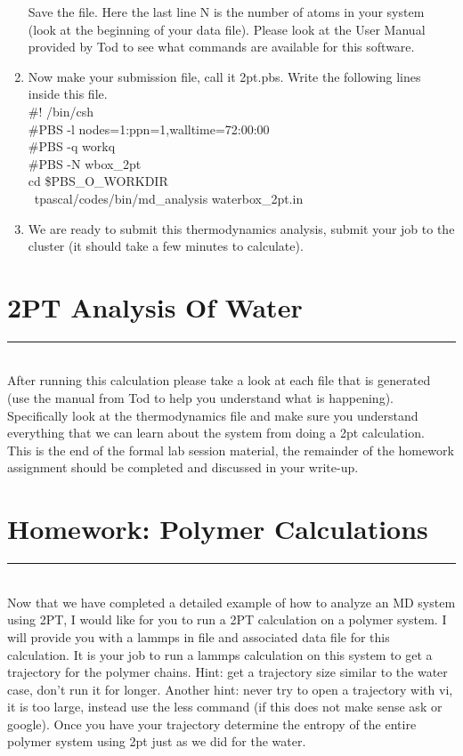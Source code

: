 \documentclass{article}
\begin{document}
\begin{enumerate}
Save the file.
Here the last line N is the number of atoms in your system (look at the beginning of your data file). 
Please look at the User Manual provided by Tod to see what commands are available for this software. \\

\item Now make your submission file, call it 2pt.pbs.
Write the following lines inside this file.\\
\#! /bin/csh\\
\#PBS -l nodes=1:ppn=1,walltime=72:00:00\\
\#PBS -q workq\\
\#PBS -N wbox\_2pt\\
cd \$PBS\_O\_WORKDIR\\
~tpascal/codes/bin/md\_analysis waterbox\_2pt.in\\

\item We are ready to submit this thermodynamics analysis, submit your job to the cluster (it should take a few minutes to calculate).
\end{enumerate}

\section{2PT Analysis Of Water}
\noindent\rule[0.5ex]{\linewidth}{1pt}\\

After running this calculation please take a look at each file that is generated (use the manual from Tod to help you understand what is happening). 
Specifically look at the thermodynamics file and make sure you understand everything that we can learn about the system from doing a 2pt calculation.\\

This is the end of the formal lab session material, the remainder of the homework assignment should be completed and discussed in your write-up.

\section{Homework: Polymer Calculations}
\noindent\rule[0.5ex]{\linewidth}{1pt}\\

Now that we have completed a detailed example of how to analyze an MD system using 2PT, I would like for you to run a 2PT calculation on a polymer system. 
I will provide you with a lammps in file and associated data file for this calculation.
It is your job to run a lammps calculation on this system to get a trajectory for the polymer chains.
Hint: get a trajectory size similar to the water case, don't run it for longer. 
Another hint: never try to open a trajectory with vi, it is too large, instead use the less command (if this does not make sense ask or google). 
Once you have your trajectory determine the entropy of the entire polymer system using 2pt just as we did for the water. \\
\end{document}
